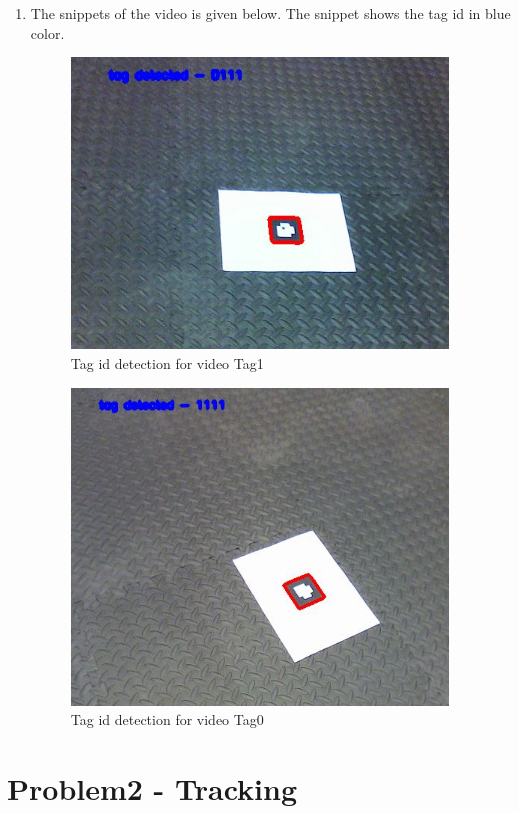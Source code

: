 \documentclass[12pt]{article}
\begin{document}
\begin{enumerate}
\begin{center}
\end{center}
\item The snippets of the video is given below. The snippet shows the tag id in blue color.
\newpage
\begin{figure}[h]
    \centering
    \includegraphics[width=10cm]{tag_id_outputvideo0}
    \caption{Tag id detection for video Tag1}
    \label{fig:Tag id output}
\end{figure}

\begin{figure}[h]
    \centering
    \includegraphics[width=10cm]{tag_id_outputvideo1}
    \caption{Tag id detection for video Tag0}
    \label{fig:Tag id output}
\end{figure}

\end{enumerate}



\section{Problem2 - Tracking}
\end{document}
